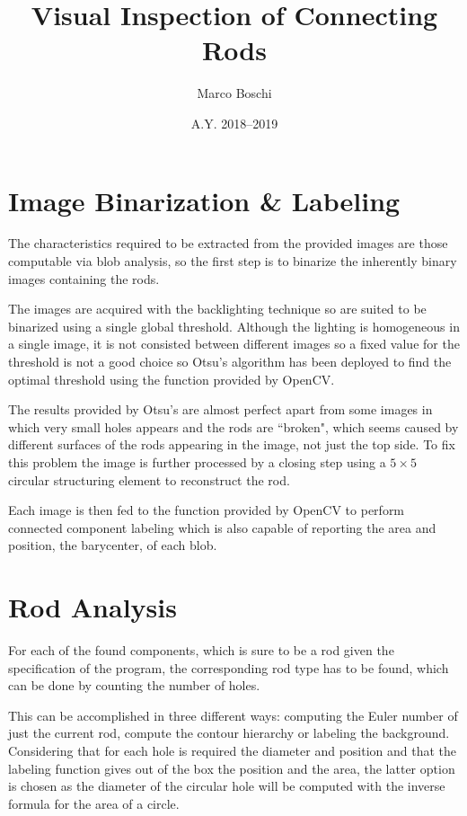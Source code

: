 

\title{Visual Inspection of Connecting Rods}
\date{A.Y. 2018--2019}
\author{Marco Boschi}




\section{Image Binarization \& Labeling}
The characteristics required to be extracted from the provided images are those computable via blob analysis, so the first step is to binarize the inherently binary images containing the rods.

The images are acquired with the backlighting technique so are suited to be binarized using a single global threshold.
Although the lighting is homogeneous in a single image, it is not consisted between different images so a fixed value for the threshold is not a good choice so Otsu's algorithm has been deployed to find the optimal threshold using the function provided by OpenCV.

The results provided by Otsu's are almost perfect apart from some images in which very small holes appears and the rods are ``broken", which seems caused by different surfaces of the rods appearing in the image, not just the top side.
To fix this problem the image is further processed by a closing step using a $5\times 5$ circular structuring element to reconstruct the rod.

Each image is then fed to the function provided by OpenCV to perform connected component labeling which is also capable of reporting the area and position, \ie the barycenter, of each blob.

\section{Rod Analysis}
For each of the found components, which is sure to be a rod given the specification of the program, the corresponding rod type has to be found, which can be done by counting the number of holes.

This can be accomplished in three different ways: computing the Euler number of just the current rod, compute the contour hierarchy or labeling the background.
Considering that for each hole is required the diameter and position and that the labeling function gives out of the box the position and the area, the latter option is chosen as the diameter of the circular hole will be computed with the inverse formula for the area of a circle.

